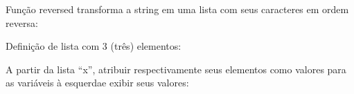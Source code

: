 \documentclass[letterpaper,10pt,brazil]{sphinxmanual}
\begin{document}
\begin{sphinxVerbatim}[commandchars=\\\{\}]
\end{sphinxVerbatim}

Função reversed transforma a string em uma lista com seus caracteres em ordem
reversa:

\begin{sphinxVerbatim}[commandchars=\\\{\}]
\end{sphinxVerbatim}

\begin{sphinxVerbatim}[commandchars=\\\{\}]
\end{sphinxVerbatim}

Definição de lista com 3 (três) elementos:

\begin{sphinxVerbatim}[commandchars=\\\{\}]
  \PYG{p}{[}  \PYG{p}{]}
\end{sphinxVerbatim}

A partir da lista “x”, atribuir respectivamente seus elementos como valores
para as variáveis à esquerdae exibir seus valores:

\begin{sphinxVerbatim}[commandchars=\\\{\}]
    
\end{sphinxVerbatim}

\begin{sphinxVerbatim}[commandchars=\\\{\}]
\end{sphinxVerbatim}

\begin{sphinxVerbatim}[commandchars=\\\{\}]
\end{sphinxVerbatim}

\begin{sphinxVerbatim}[commandchars=\\\{\}]
\end{sphinxVerbatim}
\end{document}
